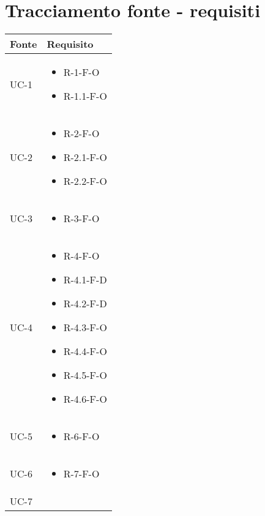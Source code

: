 \section{Tracciamento fonte - requisiti}\label{subsec:tracciamento-fonte---requisiti}

\renewcommand{\arraystretch}{1.5}
\begin{center}
    \begin{longtable}{| C{6cm} |C{6cm}|} \hline
    \textbf{Fonte} & \textbf{Requisito} \\\hline
    UC-1 &
    \begin{itemize}
        \item R-1-F-O
        \item R-1.1-F-O
    \end{itemize}
    \\\hline
    UC-2 &
    \begin{itemize}
        \item R-2-F-O
        \item R-2.1-F-O
        \item R-2.2-F-O
    \end{itemize}
    \\\hline
    UC-3 &
    \begin{itemize}
        \item R-3-F-O
    \end{itemize}\\\hline
    UC-4 &
    \begin{itemize}
        \item R-4-F-O
        \item R-4.1-F-D
        \item R-4.2-F-D
        \item R-4.3-F-O
        \item R-4.4-F-O
        \item R-4.5-F-O
        \item R-4.6-F-O
    \end{itemize}\\\hline
    UC-5 &
    \begin{itemize}
        \item R-6-F-O
    \end{itemize}\\\hline
    UC-6 &
    \begin{itemize}
        \item R-7-F-O
    \end{itemize}\\\hline
    UC-7 &
    \begin{itemize}

\end{itemize}
\end{longtable}
\end{center}
